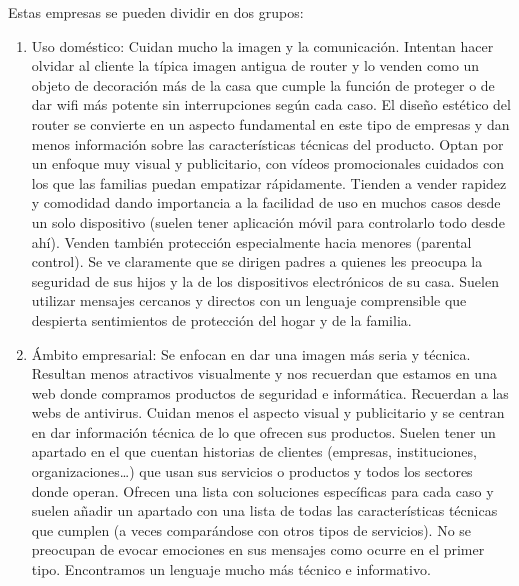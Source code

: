Estas empresas se pueden dividir en dos grupos:
\begin{enumerate}
	\item Uso doméstico: Cuidan mucho la imagen y la comunicación. Intentan hacer olvidar al cliente la típica imagen antigua de router y lo venden como un objeto de decoración más de la casa que cumple la función de proteger o de dar wifi más potente sin interrupciones según cada caso. El diseño estético del router se convierte en un aspecto fundamental en este tipo de empresas y dan menos información sobre las características técnicas del producto. Optan por un enfoque muy visual y publicitario, con vídeos promocionales cuidados con los que las familias puedan empatizar rápidamente. Tienden a vender rapidez y comodidad dando importancia a la facilidad de uso en muchos casos desde un solo dispositivo (suelen tener aplicación móvil para controlarlo todo desde ahí). Venden también protección especialmente hacia menores (parental control). Se ve claramente que se dirigen padres a quienes les preocupa la seguridad de sus hijos y la de los dispositivos electrónicos de su casa. Suelen utilizar mensajes cercanos y directos con un lenguaje comprensible que despierta sentimientos de protección del hogar y de la familia.
	\item Ámbito empresarial: Se enfocan en dar una imagen más seria y técnica. Resultan menos atractivos visualmente y nos recuerdan que estamos en una web donde compramos productos de seguridad e informática. Recuerdan a las webs de antivirus. Cuidan menos el aspecto visual y publicitario y se centran en dar información técnica de lo que ofrecen sus productos. Suelen tener un apartado en el que cuentan historias de clientes (empresas, instituciones, organizaciones…) que usan sus servicios o productos y todos los sectores donde operan. Ofrecen una lista con soluciones específicas para cada caso y suelen añadir un apartado con una lista de todas las características técnicas que cumplen (a veces comparándose con otros tipos de servicios). No se preocupan de evocar emociones en sus mensajes como ocurre en el primer tipo. Encontramos un lenguaje mucho más técnico e informativo. 
\end{enumerate}
